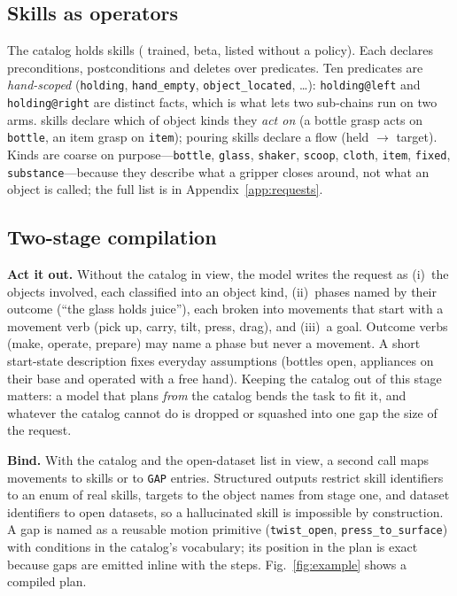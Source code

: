 \documentclass[10pt,twocolumn,letterpaper]{article}
\newcommand{\code}[1]{\texttt{\small #1}}
\begin{document}
\subsection{Skills as operators}
The catalog holds \NSkills{} skills (\NTrained{} trained, \NBeta{} beta,
\NCatalogOnly{} listed without a policy). Each declares preconditions,
postconditions and deletes over \NPredicates{} predicates. Ten predicates are
\emph{hand-scoped} (\code{holding}, \code{hand\_empty}, \code{object\_located},
\ldots): \code{holding@left} and \code{holding@right} are distinct facts, which is
what lets two sub-chains run on two arms. \NActsOn{} skills declare which of
\NKinds{} object kinds they \emph{act on} (a bottle grasp acts on \code{bottle}, an
item grasp on \code{item}); pouring skills declare a flow (held $\rightarrow$
target). Kinds are coarse on purpose---\code{bottle}, \code{glass},
\code{shaker}, \code{scoop}, \code{cloth}, \code{item}, \code{fixed},
\code{substance}---because they describe what a gripper closes around, not what an
object is called; the full list is in Appendix~\ref{app:requests}.

\subsection{Two-stage compilation}\label{sec:compile}
\textbf{Act it out.} Without the catalog in view, the model writes the request as
(i)~the objects involved, each classified into an object kind, (ii)~phases named by
their outcome (``the glass holds juice''), each broken into movements that start
with a movement verb (pick up, carry, tilt, press, drag), and (iii)~a goal. Outcome
verbs (make, operate, prepare) may name a phase but never a movement. A short
start-state description fixes everyday assumptions (bottles open, appliances on
their base and operated with a free hand). Keeping the catalog out of this stage
matters: a model that plans \emph{from} the catalog bends the task to fit it, and
whatever the catalog cannot do is dropped or squashed into one gap the size of the
request.

\textbf{Bind.} With the catalog and the open-dataset list in view, a second call
maps movements to skills or to \code{GAP} entries. Structured outputs restrict skill
identifiers to an enum of real skills, targets to the object names from stage one,
and dataset identifiers to open datasets, so a hallucinated skill is impossible by
construction. A gap is named as a reusable motion primitive (\code{twist\_open},
\code{press\_to\_surface}) with conditions in the catalog's vocabulary; its
position in the plan is exact because gaps are emitted inline with the steps.
Fig.~\ref{fig:example} shows a compiled plan.
\end{document}
